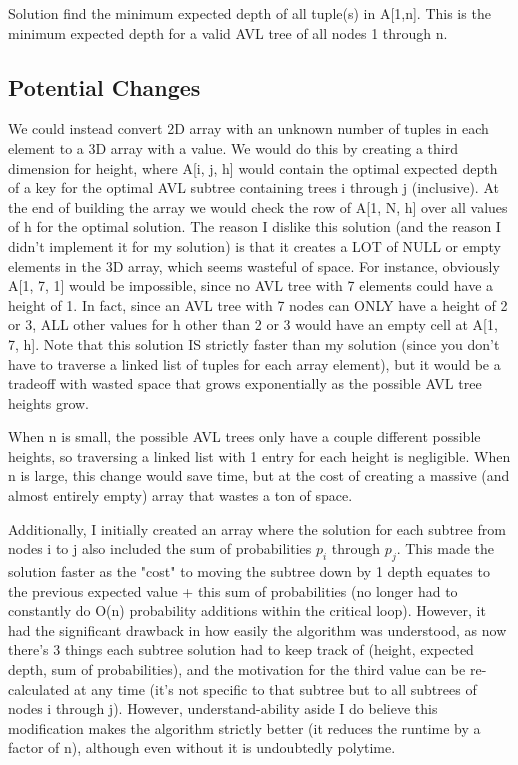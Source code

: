 \documentclass[a4paper]{article}
\begin{document}
Solution
 find the minimum expected depth of all tuple(s) in A[1,n]. This is the minimum expected depth for a valid AVL tree of all nodes 1 through n.


    

    
\subsection{Potential Changes}
We could instead convert 2D array with an unknown number of tuples in each element to a 3D array with a value. We would do this by creating a third dimension for height, where A[i, j, h] would contain the optimal expected depth of a key for the optimal AVL subtree containing trees i through j (inclusive). At the end of building the array we would check the row of A[1, N, h] over all values of h for the optimal solution. The reason I dislike this solution (and the reason I didn't implement it for my solution) is that it creates a LOT of NULL or empty elements in the 3D array, which seems wasteful of space. For instance, obviously A[1, 7, 1] would be impossible, since no AVL tree with 7 elements could have a height of 1. In fact, since an AVL tree with 7 nodes can ONLY have a height of 2 or 3, ALL other values for h other than 2 or 3 would have an empty cell at A[1, 7, h]. 
Note that this solution IS strictly faster than my solution (since you don't have to traverse a linked list of tuples for each array element), but it would be a tradeoff with wasted space that grows exponentially as the possible AVL tree heights grow.

When n is small, the possible AVL trees only have a couple different possible heights, so traversing a linked list with 1 entry for each height is negligible. When n is large, this change would save time, but at the cost of creating a massive (and almost entirely empty) array that wastes a ton of space.


Additionally, I initially created an array where the solution for each subtree from nodes i to j also included the sum of probabilities $p_i$ through $p_j$. This made the solution faster as the "cost" to moving the subtree down by 1 depth equates to the previous expected value + this sum of probabilities (no longer had to constantly do O(n) probability additions within the critical loop). However, it had the significant drawback in how easily the algorithm was understood, as now there's 3 things each subtree solution had to keep track of (height, expected depth, sum of probabilities), and the motivation for the third value can be re-calculated at any time (it's not specific to that subtree but to all subtrees of nodes i through j). However, understand-ability aside I do believe this modification makes the algorithm strictly better (it reduces the runtime by a factor of n), although even without it is undoubtedly polytime.
\end{document}
